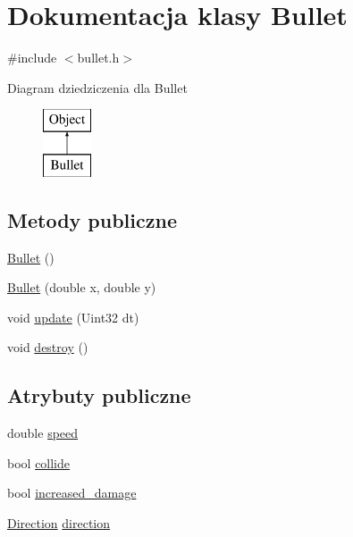\hypertarget{class_bullet}{}\section{Dokumentacja klasy Bullet}
\label{class_bullet}


{\ttfamily \#include $<$bullet.\+h$>$}

Diagram dziedziczenia dla Bullet\begin{figure}[H]
\begin{center}
\leavevmode
\includegraphics[height=2.000000cm]{class_bullet}
\end{center}
\end{figure}
\subsection*{Metody publiczne}
\begin{DoxyCompactItemize}
\item 
\hyperlink{class_bullet_acd7befc0bc18907cc1d871d37bbdddeb}{Bullet} ()
\item 
\hyperlink{class_bullet_ae40cb12a4475a5a9023fbe46d35433ab}{Bullet} (double x, double y)
\item 
void \hyperlink{class_bullet_a28c27c103a23f73d18125791c973cccd}{update} (Uint32 dt)
\item 
void \hyperlink{class_bullet_a688d6b75822e4cab5f1cbcdd1511263a}{destroy} ()
\end{DoxyCompactItemize}
\subsection*{Atrybuty publiczne}
\begin{DoxyCompactItemize}
\item 
double \hyperlink{class_bullet_aa610411cbf6fd6fa3d744c3f85c8de9f}{speed}
\item 
bool \hyperlink{class_bullet_a13bf4d55e52ef924643268607bb0db4f}{collide}
\item 
bool \hyperlink{class_bullet_a646bf8c94671a65133901b73325898d4}{increased\+\_\+damage}
\item 
\hyperlink{type_8h_a224b9163917ac32fc95a60d8c1eec3aa}{Direction} \hyperlink{class_bullet_a8a97d74eabfadabaec346a98c6b67b0e}{direction}
\end{DoxyCompactItemize}
